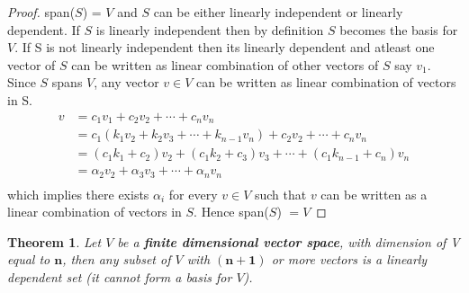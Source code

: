 \documentclass[a4paper, titlepage]{article}
\newtheorem{theorem}{Theorem}[section]
\begin{document}
        \begin{proof}
            span($S$) = $V$ and $S$ can be either linearly independent or
            linearly dependent. If $S$ is linearly independent then by definition
            $S$ becomes the basis for $V$. If S is not linearly independent
            then its linearly dependent and atleast one vector of $S$ can
            be written as linear combination of other vectors of $S$ say
            $v_1$. Since $S$ spans $V$, any vector $v \in V$ can be written
            as linear combination of vectors in S.
            \begin{align*}
                v &= c_1v_1 + c_2v_2 + \cdots + c_nv_n \\
                &= c_1(k_1v_2 + k_2v_3 + \cdots + k_{n-1}v_n) + c_2v_2 + \cdots + c_nv_n \\
                &= (c_1k_1 + c_2)v_2 + (c_1k_2 + c_3)v_3 + \cdots + (c_1k_{n-1} + c_n)v_n \\
                &= \alpha_2v_2 + \alpha_3v_3 + \cdots + \alpha_nv_n \\
            \end{align*}
            which implies there exists $\alpha_i$ for every $v \in V$ such
            that $v$ can be written as a linear combination of vectors in
            $S$. Hence span($S$) $= V$        
        \end{proof}

        \begin{theorem}
            Let $V$ be a \textbf{finite dimensional vector space}, with
            dimension of V equal to $\bm{n}$, then any subset of $V$ with 
            $\bm{(n+1)}$ or more vectors is a linearly dependent set 
            (it cannot form a basis for $V$).
        \end{theorem}
        
        \setlength{\fboxsep}{1em}
            \noindent{}
\end{document}
